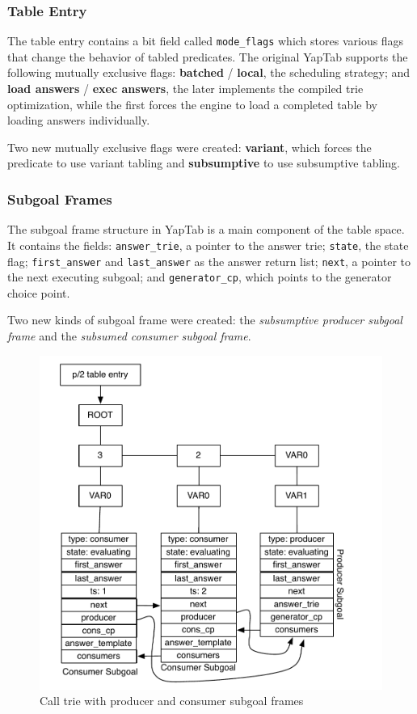 \subsubsection{Table Entry}

The table entry contains a bit field called \texttt{mode\_flags} which stores various flags
that change the behavior of tabled predicates. The original YapTab supports the
following mutually exclusive flags: \textbf{batched} / \textbf{local}, the scheduling strategy;
and \textbf{load answers} / \textbf{exec answers}, the later implements the compiled trie optimization, while the first forces the engine to load a completed table by loading answers individually.

Two new mutually exclusive flags were created: \textbf{variant}, which forces the predicate to use variant
tabling and \textbf{subsumptive} to use subsumptive tabling.

\subsubsection{Subgoal Frames}

The subgoal frame structure in YapTab is a main component of the table space.
It contains the fields: \texttt{answer\_trie}, a pointer to the answer trie;
\texttt{state}, the state flag; \texttt{first\_answer} and \texttt{last\_answer}
as the answer return list; \texttt{next}, a pointer to the next executing subgoal;
and \texttt{generator\_cp}, which points to the generator choice point.

Two new kinds of subgoal frame were created: the
\textit{subsumptive producer subgoal frame} and
the \textit{subsumed consumer subgoal frame}.

\begin{figure}[H]
  \centering
    \includegraphics[scale=0.6]{subgoal_frames.pdf}
  \caption{Call trie with producer and consumer subgoal frames}
  \label{fig:subgoal_frames}
\end{figure}

